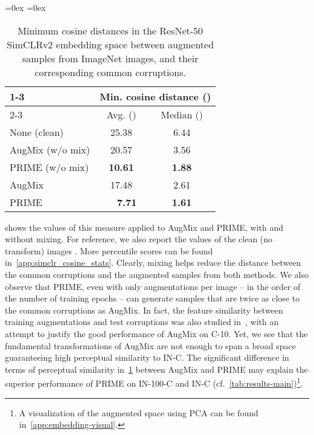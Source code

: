 \documentclass[runningheads]{llncs}
\newcommand*{\MyToprule}{\cmidrule[\heavyrulewidth]}
\newcommand*{\MyMidrule}{\cmidrule }
\begin{document}
\begin{table}[t]
\centering
    \footnotesize
    \caption{Minimum cosine distances in the ResNet-50 SimCLRv2 embedding space between  augmented samples from  ImageNet images, and their corresponding common corruptions.}
    \aboverulesep=0ex
    \belowrulesep=0ex
    \begin{tabular}{lcc}
        \MyToprule{1-3}
        \rule{0pt}{1.1EM}
        \multirow{2}{*}{Method} & \multicolumn{2}{c}{Min. cosine distance \footnotesize{()}} \\
        \MyMidrule{2-3}
        & Avg. () & Median  () \\
        \midrule
        None (clean) & 25.38 & 6.44 \\
        \midrule
AugMix (w/o mix) & 20.57 & 3.56 \\
        PRIME (w/o mix) & \textbf{10.61} & \textbf{1.88} \\
        \midrule
AugMix & 17.48 & 2.61 \\
        PRIME & \textbf{~~7.71} & \textbf{1.61} \\
\bottomrule
    \end{tabular}
\vspace*{-2mm}
    \label{tab:simclr_distances}
\end{table}
 shows the values of this measure applied to AugMix and PRIME, with and without mixing. For reference, we also report the values of the clean (no transform) images . More percentile scores can be found in~\cref{app:simclr_cosine_stats}. Clearly, mixing helps reduce the distance between the common corruptions and the augmented samples from both methods. We also observe that PRIME, even with only  augmentations per image -- in the order of the number of training epochs --  can generate samples that are twice as close to the common corruptions as AugMix. In fact, the feature similarity between training augmentations and test corruptions was also studied in~\cite{cbar2021}, with an attempt to justify the good performance of AugMix on C-10. Yet, we see that the fundamental transformations of AugMix are not enough to span a broad space guaranteeing high perceptual similarity to IN-C. The significant difference in terms of perceptual similarity in~\cref{tab:simclr_distances} between AugMix and PRIME may explain the superior performance of PRIME on IN-100-C and IN-C (cf.~\cref{tab:results-main})\footnote{A visualization of the augmented space using PCA can be found in~\cref{app:embedding-visual}.}.
\end{document}
